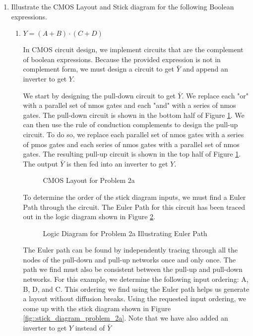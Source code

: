 \documentclass[fleqn]{article}
\begin{document}
\begin{enumerate}
		\item Illustrate the CMOS Layout and Stick diagram for the following Boolean expressions.
		
		\begin{enumerate}
			\item $Y = (A+B)\cdot(C+D)$
			
			In CMOS circuit design, we implement circuits that are the complement of boolean expressions. Because the provided expression is not in complement form, we must design a circuit to get $\bar{Y}$ and append an inverter to get $Y$.
			
			We start by designing the pull-down circuit to get $\bar{Y}$. We replace each "or" with a parallel set of nmos gates and each "and" with a series of nmos gates. The pull-down circuit is shown in the bottom half of Figure \ref{fig::cmos_layout_problem_2a}. We can then use the rule of conduction complements to design the pull-up circuit. To do so, we replace each parallel set of nmos gates with a series of pmos gates and each series of nmos gates with a parallel set of nmos gates. The resulting pull-up circuit is shown in the top half of Figure \ref{fig::cmos_layout_problem_2a}. The output $\bar{Y}$ is then fed into an inverter to get $Y$.
			
			\begin{figure}[H]
				\centerline{}
				\caption{CMOS Layout for Problem 2a}
				\label{fig::cmos_layout_problem_2a}
			\end{figure}
			
			To determine the order of the stick diagram inputs, we must find a Euler Path through the circuit. The Euler Path for this circuit has been traced out in the logic diagram shown in Figure \ref{fig::logic_diagram_problem_2a}.
			
			\begin{figure}[H]
				\centerline{}
				\caption{Logic Diagram for Problem 2a Illustrating Euler Path}
				\label{fig::logic_diagram_problem_2a}
			\end{figure}
			
			The Euler path can be found by independently tracing through all the nodes of the pull-down and pull-up networks once and only once. The path we find must also be consistent between the pull-up and pull-down networks. For this example, we determine the following input ordering: A, B, D, and C. This ordering we find using the Euler path helps us generate a layout without diffusion breaks. Using the requested input ordering, we come up with the stick diagram shown in Figure \ref{fig::stick_diagram_problem_2a}. Note that we have also added an inverter to get $Y$ instead of $\bar{Y}$
			

\end{enumerate}
\end{enumerate}
\end{document}
